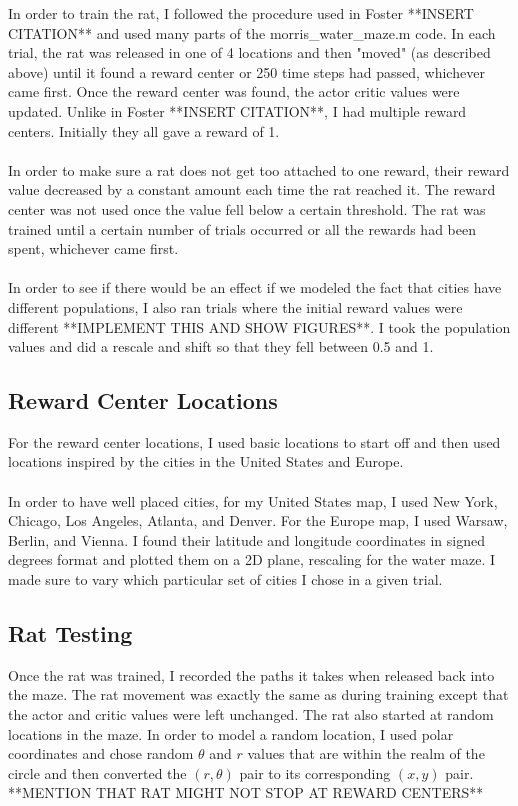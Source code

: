 \documentclass[conference]{IEEEtran}
\begin{document}
In order to train the rat, I followed the procedure used in Foster **INSERT CITATION** and used many parts of the morris\_water\_maze.m code. In each trial, the rat was released in one of 4 locations and then "moved" (as described above) until it found a reward center or 250 time steps had passed, whichever came first. Once the reward center was found, the actor critic values were updated. Unlike in Foster **INSERT CITATION**, I had multiple reward centers. Initially they all gave a reward of 1.\\
\\
In order to make sure a rat does not get too attached to one reward, their reward value decreased by a constant amount each time the rat reached it. The reward center was not used once the value fell below a certain threshold. The rat was trained until a certain number of trials occurred or all the rewards had been spent, whichever came first. \\
\\
In order to see if there would be an effect if we modeled the fact that cities have different populations, I also ran trials where the initial reward values were different **IMPLEMENT THIS AND SHOW FIGURES**. I took the population values and did a rescale and shift so that they fell between 0.5 and 1. 

\subsection{Reward Center Locations}
For the reward center locations, I used basic locations to start off and then used locations inspired by the cities in the United States and Europe. \\
\\
In order to have well placed cities, for my United States map, I used New York, Chicago, Los Angeles, Atlanta, and Denver. For the Europe map, I used Warsaw, Berlin, and Vienna. I found their latitude and longitude coordinates in signed degrees format and plotted them on a 2D plane, rescaling for the water maze. I made sure to vary which particular set of cities I chose in a given trial. 

\subsection{Rat Testing}

Once the rat was trained, I recorded the paths it takes when released back into the maze. The rat movement was exactly the same as during training except that the actor and critic values were left unchanged. The rat also started at random locations in the maze. In order to model a random location, I used polar coordinates and chose random $\theta$ and $r$ values that are within the realm of the circle and then converted the $(r,\theta)$ pair to its corresponding $(x,y)$ pair. 
**MENTION THAT RAT MIGHT NOT STOP AT REWARD CENTERS**
\end{document}
